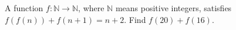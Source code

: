 A function $f:\mathbb N\to\mathbb N$, where $\mathbb N$ means positive integers, satisfies $f(f(n))+f(n+1)=n+2$. Find $f(20)+f(16)$.

